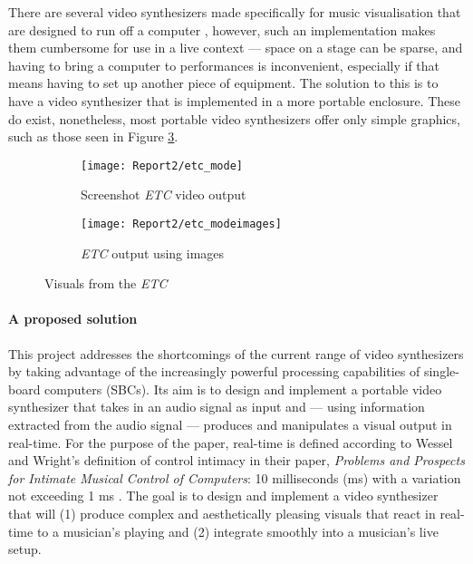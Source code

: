 \documentclass{report}
\begin{document}
There are several video synthesizers made specifically for music visualisation that are designed to run off a computer \cite{Casey2008}, however, such an implementation makes them cumbersome for use in a live context --- space on a stage can be sparse, and having to bring a computer to performances is inconvenient, especially if that means having to set up another piece of equipment. The solution to this is to have a video synthesizer that is implemented in a more portable enclosure. These do exist, nonetheless, most portable video synthesizers offer only simple graphics, such as those seen in Figure \ref{fig:etc}.

\begin{figure}[b]
  \begin{subfigure}{0.5\textwidth}
    \centering
    \texttt{[image: Report2/etc\_mode]}
    \caption{Screenshot \textit{ETC} video output}
    \label{fig:etc_mode}
  \end{subfigure}
  \begin{subfigure}{0.5\textwidth}
    \centering
    \texttt{[image: Report2/etc\_modeimages]}
    \caption{\textit{ETC} output using images}
    \label{fig:etc_modeimages}
  \end{subfigure}
  \caption{Visuals from the \textit{ETC}}
  \label{fig:etc}
\end{figure}

\paragraph{A proposed solution}
This project addresses the shortcomings of the current range of video synthesizers by taking advantage of the increasingly powerful processing capabilities of single-board computers (SBCs). Its aim is to design and implement a portable video synthesizer that takes in an audio signal as input and --- using information extracted from the audio signal --- produces and manipulates a visual output in real-time. For the purpose of the paper, real-time is defined according to Wessel and Wright's definition of control intimacy in their paper, \textit{Problems and Prospects for Intimate Musical Control of Computers}: 10 milliseconds (ms) with a variation not exceeding 1 ms \cite{Wessel2002}. The goal is to design and implement a video synthesizer that will (1) produce complex and aesthetically pleasing visuals that react in real-time to a musician's playing and (2) integrate smoothly into a musician's live setup. \par
\end{document}
